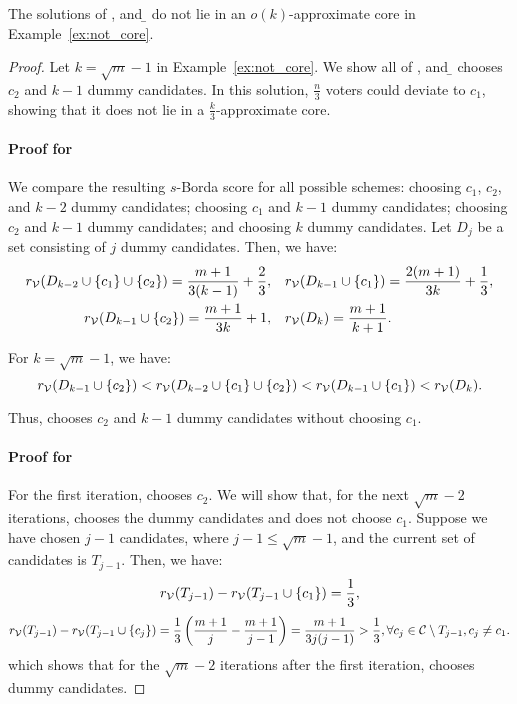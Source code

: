 

\begin{theorem}
The solutions of \opt{}, \g{} and \b{} do not lie in an $o(k)$-approximate core in Example~\ref{ex:not_core}. 
\label{thm:borda_to_core}
\end{theorem}
\begin{proof}
Let $k = \sqrt{m} - 1$ in Example~\ref{ex:not_core}. We show all of \opt{}, \g{} and \b{} chooses $c_2$ and $k - 1$ dummy candidates. In this solution, $\frac{n}{3}$ voters could deviate to $c_1$, showing that it does not lie in a $\frac{k}{3}$-approximate core.

\paragraph{Proof for \opt{}}  
We compare the resulting $s$-Borda score for all possible schemes: choosing $c_1$, $c_2$, and $k - 2$ dummy candidates; choosing $c_1$ and $k - 1$ dummy candidates; choosing $c_2$ and $k - 1$ dummy candidates; and choosing $k$ dummy candidates. Let $D_j$ be a set consisting of $j$ dummy candidates. Then, we have:
\begin{align*}
r_{\mathcal{V}}(D_{k - 2} \cup \{c_1\} \cup \{c_2\}) = \frac{m + 1}{3(k - 1)} + \frac{2}{3}, &\quad r_{\mathcal{V}}(D_{k - 1} \cup \{c_1\}) = \frac{2(m + 1)}{3k} + \frac{1}{3},\\
r_{\mathcal{V}}(D_{k - 1} \cup \{c_2\}) = \frac{m + 1}{3k} + 1, &\quad r_{\mathcal{V}}(D_k) = \frac{m + 1}{k + 1}.
\end{align*}

For $k = \sqrt{m} - 1$, we have:
$$r_{\mathcal{V}}(D_{k - 1} \cup \{c_2\}) < r_{\mathcal{V}}(D_{k - 2} \cup \{c_1\}\cup\{c_2\}) <  r_{\mathcal{V}}(D_{k - 1} \cup \{c_1\}) < r_{\mathcal{V}}(D_k).$$

Thus, \opt{} chooses $c_2$ and $k - 1$ dummy candidates without choosing $c_1$.

\paragraph{Proof for \g{}}
For the first iteration, \g{} chooses $c_2$. We will show that, for the next $\sqrt{m} - 2$ iterations, \g{} chooses the dummy candidates and does not choose $c_1$. Suppose we have chosen $j - 1$ candidates, where $j - 1 \leq \sqrt{m} - 1$, and the current set of candidates is $T_{j - 1}$. Then, we have:
\[
r_{\mathcal{V}}(T_{j - 1}) - r_{\mathcal{V}}(T_{{j - 1}} \cup \{c_1\}) = \frac{1}{3},
\]
\[
r_{\mathcal{V}}(T_{j - 1}) - r_{\mathcal{V}}(T_{j - 1} \cup \{c_j\}) = \frac{1}{3}\left(\frac{m + 1}{j} - \frac{m + 1}{j - 1}\right) = \frac{m + 1}{3j(j - 1)} > \frac{1}{3}, \forall c_j \in \mathcal{C} \setminus T_{j - 1}, c_j \neq c_1.
\]
which shows that for the $\sqrt{m} - 2$ iterations after the first iteration, \g{} chooses dummy candidates.


\end{proof}
